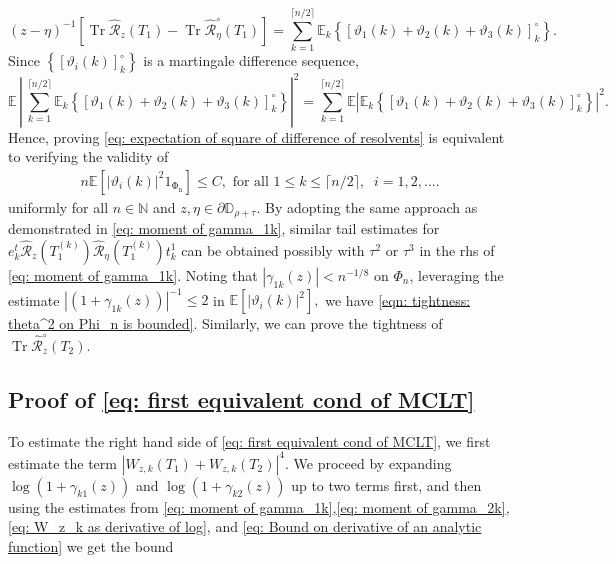 \documentclass[12pt]{amsart}
\theoremstyle{plain}
\theoremstyle{definition}
\newcommand{\Tr}{\operatorname{Tr}}
\begin{document}
$$
(z-\eta)^{-1}\left[\Tr  \hat{\mathcal{R}}_z(T_1)-\Tr  \hat{\mathcal{R}}_\eta^{\circ}(T_1)\right]=\sum_{k=1}^{\lceil n/2 \rceil} \mathbb{E}_k\left\{\left[\vartheta_1(k)+\vartheta_2(k)+\vartheta_3(k)\right]_k^\circ \right\} .
$$
Since $\left\{\left[\vartheta_i(k)\right]_k^\circ \right\}$ is a martingale difference sequence,
$$
 \mathbb{E} \, \left| \, \sum_{k=1}^{\lceil n/2 \rceil} \mathbb{E}_k \left\{ \left[ \vartheta_{1}(k) + \vartheta_2(k) + \vartheta_3(k) \right]_k^\circ \right\} \right|^2 = \sum_{k=1}^{\lceil n/2 \rceil} \mathbb{E} \left| \mathbb{E}_k \left\{ \left[ \vartheta_1(k) + \vartheta_2(k) + \vartheta_3(k) \right]_k^\circ \right\} \right|^2.
$$
Hence, proving \eqref{eq: expectation of square of difference of resolvents} is equivalent to verifying the validity of
\begin{align}
    n\mathbb{E} [|\vartheta_i(k)|^2 1_{\mathrm{\Phi_n}}] \leq C, \text{ for all } 1 \leq k \leq \lceil n/2 \rceil, \;\; i=1,2,\dots. \label{eqn: tightness: theta^2 on Phi_n is bounded}
\end{align}
uniformly for all $n \in \mathbb{N}$ and $z, \eta \in \partial{\mathbb{D}}_{\rho + \tau}$. By adopting the same approach as demonstrated in \eqref{eq: moment of gamma_1k}, similar tail estimates for $e_k^t\hat{\mathcal{R}}_z\left(T_{1}^{(k)}\right) \hat{\mathcal{R}}_\eta \left(T_{1}^{(k)}\right) t_k^1$ can be obtained possibly with $\tau^{2}$ or $\tau^{3}$ in the rhs of \eqref{eq: moment of gamma_1k}. Noting that $|\gamma_{1k}(z)| < n^{-1/8}$ on $\Phi_n$, leveraging the estimate $|(1+\gamma_{1k}(z))|^{-1}\leq 2$ in $\mathbb{E}[|\vartheta_i(k)|^2],$ we have \eqref{eqn: tightness: theta^2 on Phi_n is bounded}. Similarly, we can prove the tightness of $\Tr \hat{\mathcal{R}}_z^{\circ}(T_2)$.


\subsection{Proof of \eqref{eq: first equivalent cond of MCLT}}


To estimate the right hand side of \eqref{eq: first equivalent cond of MCLT}, we first estimate the term $|W_{z,k}(T_1)+W_{z,k}(T_2)|^4$. We proceed by expanding $\operatorname{\log}(1+\gamma_{k1}(z))$ and $\operatorname{\log}(1+\gamma_{k2}(z))$ up to two terms first, and then using the estimates from \eqref{eq: moment of gamma_1k},\eqref{eq: moment of gamma_2k},\eqref{eq: W_z_k as derivative of log}, and \eqref{eq: Bound on derivative of an analytic function} we get the bound
\end{document}
